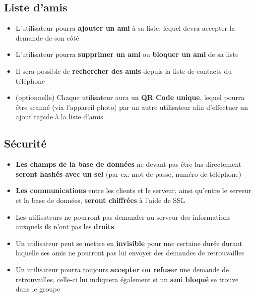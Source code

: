 \documentclass[french]{article}
\begin{document}
		\subsection{Liste d'amis}
			\begin{itemize}
				\item L'utilisateur pourra \textbf{ajouter un ami} à sa liste, lequel devra accepter la demande de son côté
				\item L'utilisateur pourra \textbf{supprimer un ami} ou \textbf{bloquer un ami} de sa liste
				\item Il sera possible de \textbf{rechercher des amis} depuis la liste de contacts du téléphone
				\item (optionnelle) Chaque utilisateur aura un \textbf{QR Code unique}, lequel pourra être scanné (via l'appareil photo) par un autre utilisateur afin d'effectuer un ajout rapide à la liste d'amis 
			\end{itemize}
		
		\subsection{Sécurité}
			\begin{itemize}
				\item \textbf{Les champs de la base de données} ne devant pas être lus directement \textbf{seront hashés avec un sel} (par ex: mot de passe, numéro de téléphone)
				\item \textbf{Les communications} entre les clients et le serveur, ainsi qu'entre le serveur et la base de données, \textbf{seront chiffrées} à l'aide de SSL
				\item Les utilisateurs ne pourront pas demander au serveur des informations auxquels ils n'ont pas les \textbf{droits} 
				\item Un utilisateur peut se mettre en \textbf{invisible} pour une certaine durée durant laquelle ses amis ne pourront pas lui envoyer des demandes de retrouvailles
				\item Un utilisateur pourra toujours \textbf{accepter ou refuser} une demande de retrouvailles, celle-ci lui indiquera également si un \textbf{ami bloqué} se trouve dans le groupe
			\end{itemize}
		
\end{document}
